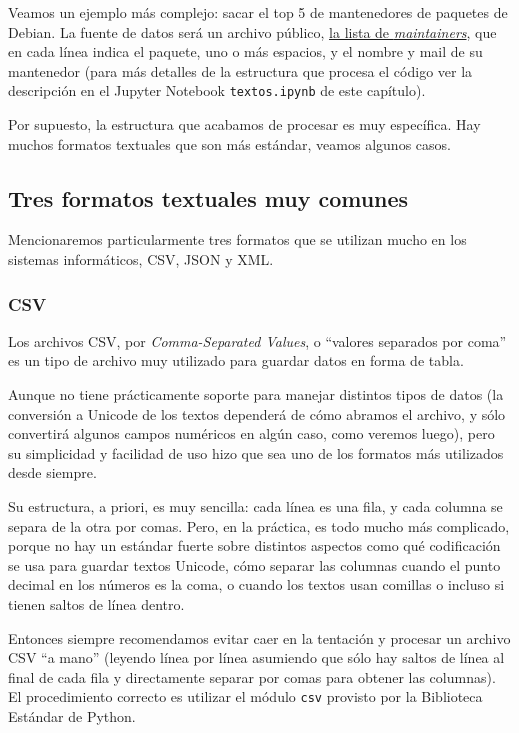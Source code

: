 
Veamos un ejemplo más complejo: sacar el top 5 de mantenedores de paquetes de Debian. La fuente de datos será un archivo público, \href{http://ftp.uk.debian.org/debian/indices/Maintainers}{la lista de \textit{maintainers}}, que en cada línea indica el paquete, uno o más espacios, y el nombre y mail de su mantenedor (para más detalles de la estructura que procesa el código ver la descripción en el Jupyter Notebook \texttt{textos.ipynb} de este capítulo).


Por supuesto, la estructura que acabamos de procesar es muy específica. Hay muchos formatos textuales que son más estándar, veamos algunos casos.


\subsection{Tres formatos textuales muy comunes}

Mencionaremos particularmente tres formatos que se utilizan mucho en los sistemas informáticos, CSV, JSON y XML.

\subsubsection{CSV}

Los archivos CSV, por \textit{Comma-Separated Values}, o ``valores separados por coma'' es un tipo de archivo muy utilizado para guardar datos en forma de tabla. 

Aunque no tiene prácticamente soporte para manejar distintos tipos de datos (la conversión a Unicode de los textos dependerá de cómo abramos el archivo, y sólo convertirá algunos campos numéricos en algún caso, como veremos luego), pero su simplicidad y facilidad de uso hizo que sea uno de los formatos más utilizados desde siempre.

Su estructura, a priori, es muy sencilla: cada línea es una fila, y cada columna se separa de la otra por comas. Pero, en la práctica, es todo mucho más complicado, porque no hay un estándar fuerte sobre distintos aspectos como qué codificación se usa para guardar textos Unicode, cómo separar las columnas cuando el punto decimal en los números es la coma, o cuando los textos usan comillas o incluso si tienen saltos de línea dentro.

Entonces siempre recomendamos evitar caer en la tentación y procesar un archivo CSV ``a mano'' (leyendo línea por línea asumiendo que sólo hay saltos de línea al final de cada fila y directamente separar por comas para obtener las columnas). El procedimiento correcto es utilizar el módulo \texttt{csv} provisto por la Biblioteca Estándar de Python.

